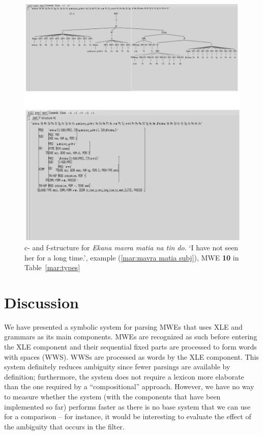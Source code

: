 \documentclass[output=paper]{langsci/langscibook}
\begin{document}
 \begin{figure}[p]%
 \caption{\label{mar:Sfig6}c- and f-structure for \textit{Ekana mavra matia na tin do.} `I have not seen her for a long time.', example (\ref{mar:mavra matia subj}), MWE \textbf{10} in Table~\ref{mar:types}}
 \centering
 \includegraphics[width=1.\textwidth]{figures/example10a}
 \end{figure}
 

\section{Discussion}
We have presented a symbolic system for parsing MWEs that uses XLE and  grammars as its main components. MWEs are recognized as such before entering the XLE component and their sequential fixed parts are processed to form words with spaces (WWS). WWSs are processed as words by the XLE component. This system definitely reduces ambiguity since fewer parsings are available by definition; furthermore, the system does not require a lexicon more elaborate than the one required by a ``compositional'' approach. However, we have no way to measure whether the system (with the components that have been implemented so far) performs faster as there is no base system that we can use for a comparison -- for instance, it would be interesting to evaluate the effect of the ambiguity that occurs in the filter. 
\end{document}
